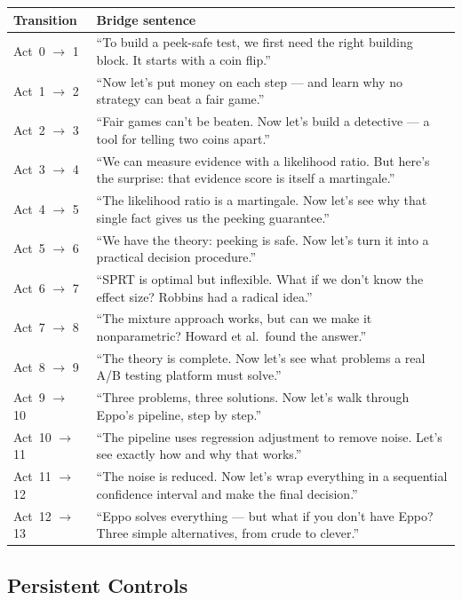 \documentclass[12pt, a4paper]{article}
\begin{document}
\begin{center}
\renewcommand{\arraystretch}{1.3}
\begin{tabular}{@{} l p{9cm} @{}}
\toprule
\textbf{Transition} & \textbf{Bridge sentence} \\
\midrule
Act~0 $\to$ 1 & ``To build a peek-safe test, we first need the right
  building block.  It starts with a coin flip.'' \\
Act~1 $\to$ 2 & ``Now let's put money on each step --- and learn why no
  strategy can beat a fair game.'' \\
Act~2 $\to$ 3 & ``Fair games can't be beaten.  Now let's build a detective
  --- a tool for telling two coins apart.'' \\
Act~3 $\to$ 4 & ``We can measure evidence with a likelihood ratio.  But
  here's the surprise: that evidence score is itself a martingale.'' \\
Act~4 $\to$ 5 & ``The likelihood ratio is a martingale.  Now let's see why
  that single fact gives us the peeking guarantee.'' \\
Act~5 $\to$ 6 & ``We have the theory: peeking is safe.  Now let's turn it
  into a practical decision procedure.'' \\
Act~6 $\to$ 7 & ``SPRT is optimal but inflexible.  What if we don't know
  the effect size?  Robbins had a radical idea.'' \\
Act~7 $\to$ 8 & ``The mixture approach works, but can we make it
  nonparametric?  Howard et al.\ found the answer.'' \\
Act~8 $\to$ 9 & ``The theory is complete.  Now let's see what
  problems a real A/B testing platform must solve.'' \\
Act~9 $\to$ 10 & ``Three problems, three solutions.  Now let's walk through
  Eppo's pipeline, step by step.'' \\
Act~10 $\to$ 11 & ``The pipeline uses regression adjustment to remove noise.
  Let's see exactly how and why that works.'' \\
Act~11 $\to$ 12 & ``The noise is reduced.  Now let's wrap everything in a
  sequential confidence interval and make the final decision.'' \\
Act~12 $\to$ 13 & ``Eppo solves everything --- but what if you don't have
  Eppo?  Three simple alternatives, from crude to clever.'' \\
\bottomrule
\end{tabular}
\end{center}

\subsection{Persistent Controls}
\end{document}
